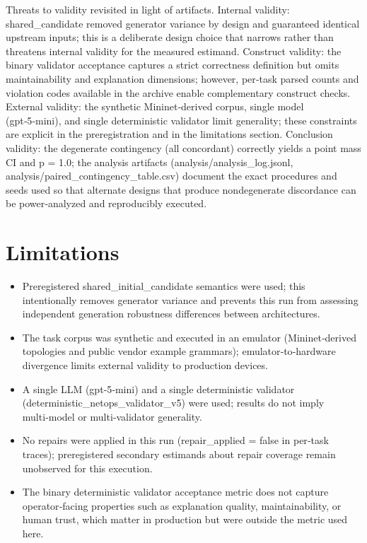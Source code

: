 \documentclass[conference]{IEEEtran}
\begin{document}
Threats to validity revisited in light of artifacts. Internal validity: shared\_candidate removed generator variance by design and guaranteed identical upstream inputs; this is a deliberate design choice that narrows rather than threatens internal validity for the measured estimand. Construct validity: the binary validator acceptance captures a strict correctness definition but omits maintainability and explanation dimensions; however, per‑task parsed counts and violation codes available in the archive enable complementary construct checks. External validity: the synthetic Mininet‑derived corpus, single model (gpt‑5‑mini), and single deterministic validator limit generality; these constraints are explicit in the preregistration and in the limitations section. Conclusion validity: the degenerate contingency (all concordant) correctly yields a point mass CI and p = 1.0; the analysis artifacts (analysis/analysis\_log.jsonl, analysis/paired\_contingency\_table.csv) document the exact procedures and seeds used so that alternate designs that produce nondegenerate discordance can be power‑analyzed and reproducibly executed.

\section{Limitations}
\begin{itemize}
\item Preregistered shared\_initial\_candidate semantics were used; this intentionally removes generator variance and prevents this run from assessing independent generation robustness differences between architectures.
\item The task corpus was synthetic and executed in an emulator (Mininet‑derived topologies and public vendor example grammars); emulator‑to‑hardware divergence limits external validity to production devices.
\item A single LLM (gpt‑5‑mini) and a single deterministic validator (deterministic\_netops\_validator\_v5) were used; results do not imply multi‑model or multi‑validator generality.
\item No repairs were applied in this run (repair\_applied = false in per‑task traces); preregistered secondary estimands about repair coverage remain unobserved for this execution.
\item The binary deterministic validator acceptance metric does not capture operator‑facing properties such as explanation quality, maintainability, or human trust, which matter in production but were outside the metric used here.
\end{itemize}
\end{document}
